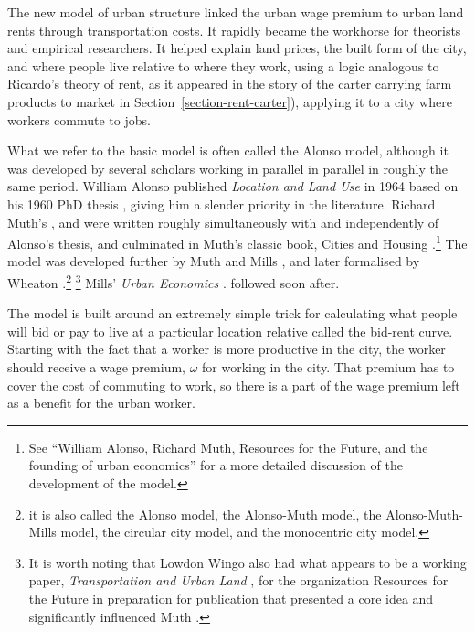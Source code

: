 The new  model of urban structure linked the urban wage premium to urban land rents through transportation costs.  It rapidly became the workhorse for theorists and empirical researchers. It helped explain land prices, the built form of the city, and where people live relative to where they work, using a logic analogous to Ricardo's theory of rent, as it appeared in the story of the carter carrying farm products to market in Section~\ref{section-rent-carter}), applying it to a city where workers commute to jobs. 


What we refer to the basic model is often called the Alonso model, although it  was developed by several scholars working in parallel in parallel in roughly the same period. William Alonso published \textit{Location and Land Use} in 1964  \cite{alonsoLocationLandUse1964} based on his 1960 PhD thesis \cite{alonsoModelUrbanLand1960},  
giving him a slender priority in the literature. 
Richard Muth's \cite{muthSpatialStructureHousing1961}, and \cite{muthRationalExpectationsTheory1961} were written roughly simultaneously with and independently of Alonso's thesis, and culminated in Muth's classic book, Cities and Housing  \cite{muthCitiesHousingSpatial1969}.\footnote{See ``William Alonso, Richard Muth, Resources for  the Future, and the founding of urban economics''\cite{mcdonaldWilliamAlonsoRichard2007} for a more detailed discussion of the development of the model.}  %
 The model was developed further by Muth \cite{muthCitiesHousingSpatial1969} and Mills \cite{millsAggregativeModelResource1967}, and later formalised by Wheaton \cite{wheatonComparativeStaticAnalysis1974}.\footnote{it is also called the Alonso model, the Alonso-Muth model, the Alonso-Muth-Mills model, the circular city model, and the monocentric city model.} %
\footnote{It is worth noting that Lowdon Wingo also had what appears to be a working paper, \textit{Transportation and Urban Land} \cite{wingoTransportationUrbanLand1961}, for the organization Resources for the Future  in preparation for publication that presented a core idea and  significantly influenced Muth \cite{mcdonaldWilliamAlonsoRichard2007}.} Mills' \textit{Urban Economics} \cite{millsUrbanEconomics1972}. followed soon after. 

The model is built around an extremely simple trick for calculating what people will bid or pay to live at a particular location relative called the \gls{bid-rent curve}. Starting with the fact that a worker is more productive in the city, the worker should receive a wage premium, $\omega$ for working in the city. That premium has to cover the cost of commuting to work, so there is  a part of the  wage premium left as a benefit for the urban worker. 

